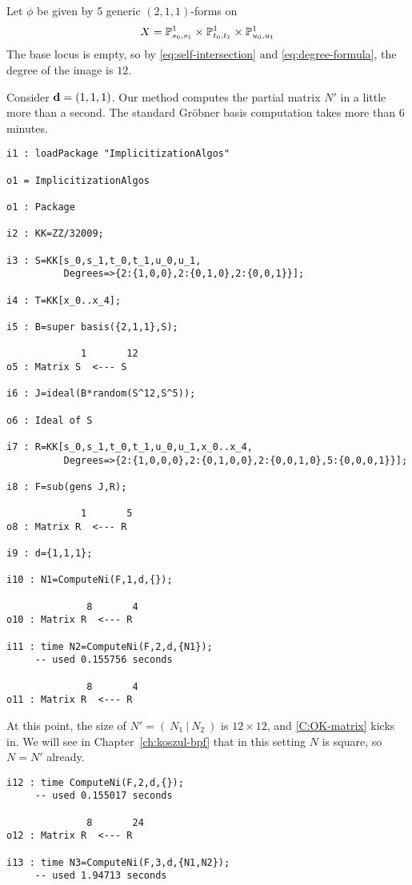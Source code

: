 \documentclass[fleqn,reqno]{amsart}
\numberwithin{first}{chapter}
\begin{document}
\begin{example}[$\mt{ex601}$]
\label{ex601}
Let $\phi$ be given by 5 generic $(2,1,1)$-forms on
\[
	X=\mathbb{P}^1_{s_0,s_1}\times\mathbb{P}^1_{t_0,t_1}\times\mathbb{P}^1_{u_0,u_1}
\]
The base locus is empty,
so by \eqref{eq:self-intersection} and \eqref{eq:degree-formula},
the degree of the image is $12$.

Consider $\mathbf d=(1,1,1)$.
Our method computes the partial matrix $N'$ in a little more than a second.
The standard Gr\"obner basis computation takes more than 6 minutes.
\begin{verbatim}
i1 : loadPackage "ImplicitizationAlgos"

o1 = ImplicitizationAlgos

o1 : Package

i2 : KK=ZZ/32009;

i3 : S=KK[s_0,s_1,t_0,t_1,u_0,u_1,
          Degrees=>{2:{1,0,0},2:{0,1,0},2:{0,0,1}}];

i4 : T=KK[x_0..x_4];

i5 : B=super basis({2,1,1},S);

             1       12
o5 : Matrix S  <--- S

i6 : J=ideal(B*random(S^12,S^5));

o6 : Ideal of S

i7 : R=KK[s_0,s_1,t_0,t_1,u_0,u_1,x_0..x_4,
          Degrees=>{2:{1,0,0,0},2:{0,1,0,0},2:{0,0,1,0},5:{0,0,0,1}}];

i8 : F=sub(gens J,R);

             1       5
o8 : Matrix R  <--- R

i9 : d={1,1,1};

i10 : N1=ComputeNi(F,1,d,{});

              8       4
o10 : Matrix R  <--- R

i11 : time N2=ComputeNi(F,2,d,{N1});
     -- used 0.155756 seconds

              8       4
o11 : Matrix R  <--- R
\end{verbatim}
At this point, the size of $N'=(~N_1~|~N_2~)$ is $12\times12$,
and \eqref{C:OK-matrix} kicks in.
We will see in Chapter~\ref{ch:koszul-bpf} that in this setting $N$ is square,
so $N=N'$ already.

\begin{verbatim}
i12 : time ComputeNi(F,2,d,{});
     -- used 0.155017 seconds

              8       24
o12 : Matrix R  <--- R

i13 : time N3=ComputeNi(F,3,d,{N1,N2});
     -- used 1.94713 seconds


\end{verbatim}
\end{example}
\end{document}
